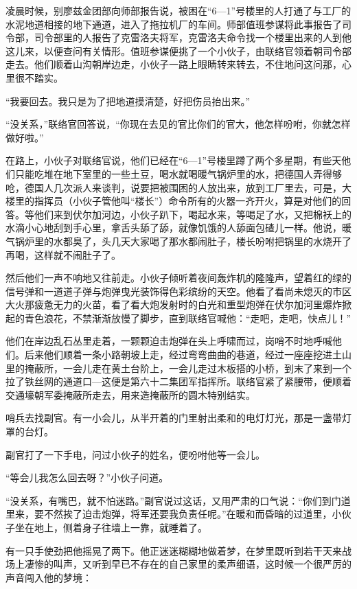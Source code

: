凌晨时候，别廖兹金团部向师部报告说，被困在“6—1”号楼里的人打通了与工厂的水泥地道相接的地下通道，进入了拖拉机厂的车间。师部值班参谋将此事报告了司令部，司令部里的人报告了克雷洛夫将军，克雷洛夫命令找一个楼里出来的人到他这儿来，以便查问有关情形。值班参谋便挑了一个小伙子，由联络官领着朝司令部走去。他们顺着山沟朝岸边走，小伙子一路上眼睛转来转去，不住地问这问那，心里很不踏实。

“我要回去。我只是为了把地道摸清楚，好把伤员抬出来。”

“没关系，”联络官回答说，“你现在去见的官比你们的官大，他怎样吩咐，你就怎样做好啦。”

在路上，小伙子对联络官说，他们已经在“6—1”号楼里蹲了两个多星期，有些天他们只能吃堆在地下室里的一些土豆，喝水就喝暖气锅炉里的水，把德国人弄得够呛，德国人几次派人来谈判，说要把被围困的人放出来，放到工厂里去，可是，大楼里的指挥员（小伙子管他叫“楼长”）命令所有的火器一齐开火，算是对他们的回答。等他们来到伏尔加河边，小伙子趴下，喝起水来，等喝足了水，又把棉袄上的水滴小心地刮到手心里，拿舌头舔了舔，就像饥饿的人舔面包碴儿一样。他说，暖气锅炉里的水都臭了，头几天大家喝了那水都闹肚子，楼长吩咐把锅里的水烧开了再喝，这样就不闹肚子了。

然后他们一声不响地又往前走。小伙子倾听着夜间轰炸机的隆隆声，望着红的绿的信号弹和一道道子弹与炮弹曳光装饰得色彩缤纷的天空。他看了看尚未熄灭的市区大火那疲惫无力的火苗，看了看大炮发射时的白光和重型炮弹在伏尔加河里爆炸掀起的青色浪花，不禁渐渐放慢了脚步，直到联络官喊他：“走吧，走吧，快点儿！”

他们在岸边乱石丛里走着，一颗颗迫击炮弹在头上呼啸而过，岗哨不时地呼喊他们。后来他们顺着一条小路朝坡上走，经过弯弯曲曲的巷道，经过一座座挖进土山里的掩蔽所，一会儿走在黄土台阶上，一会儿走过木板搭的小桥，到末了来到一个拉了铁丝网的通道口—这便是第六十二集团军指挥所。联络官紧了紧腰带，便顺着交通壕朝军委掩蔽所走去，用来造掩蔽所的圆木特别结实。

哨兵去找副官。有一小会儿，从半开着的门里射出柔和的电灯灯光，那是一盏带灯罩的台灯。

副官打了一下手电，问过小伙子的姓名，便吩咐他等一会儿。

“等会儿我怎么回去呀？”小伙子问道。

“没关系，有嘴巴，就不怕迷路。”副官说过这话，又用严肃的口气说：“你们到门道里来，要不然挨了迫击炮弹，将军还要我负责任呢。”在暖和而昏暗的过道里，小伙子坐在地上，侧着身子往墙上一靠，就睡着了。

有一只手使劲把他摇晃了两下。他正迷迷糊糊地做着梦，在梦里既听到若干天来战场上凄惨的叫声，又听到早已不存在的自己家里的柔声细语，这时候一个很严厉的声音闯入他的梦境：

